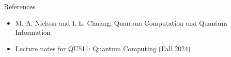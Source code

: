 \documentclass[9pt]{beamer}
\begin{document}
    \begin{frame}{References}
        
        \begin{itemize}
            \item M. A. Nielson and I. L. Chuang, Quantum Computation and Quantum Information
            \item Lecture notes for QU511: Quantum Computing (Fall 2024)
        \end{itemize}
        \vspace{6cm}
    \end{frame}
\end{document}

